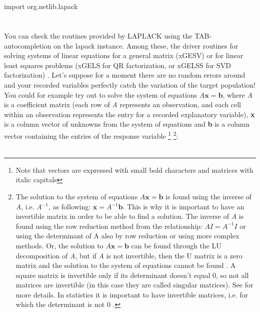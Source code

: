 \documentclass {article}
\begin{document}
\\
\\
import org.netlib.lapack\\
\\
\\
You can check the routines provided by LAPLACK using the TAB-autocompletion on the lapack instance. Among these, the driver routines for solving systems of linear equations for a general matrix (xGESV) or for linear least squares problems (xGELS for QR factorization, or xGELSS for SVD factorization) \cite{anderson_lapack_1999}. 
Let's suppose for a moment there are no random errors around and your recorded variables perfectly catch the variation of the target population! You could for example try out to solve the system of equations $A\textbf{x}=\textbf{b}$, where \textit{A} is a coefficient matrix (each row of \textit{A} represents an observation, and each cell within an observation represents the entry for a recorded explanatory variable), \textbf{x} is a column vector of unknowns from the system of equations and \textbf{b} is a column vector containing the entries of the response variable \cite{golub_matrix_2013} \cite{nag_ltd._nag_nodate} \cite{seymour_using_2017} \cite{dawkins_pauls_2005} \cite{odersky_programming_2010} \cite{lewis_introduction_2017}
 \footnote{Note that vectors are expressed with small bold characters and matrices with italic capitals} 
\footnote{The solution to the system of equations $A\textbf{x}=\textbf{b}$ is found using the inverse of \textit{A}, i.e. \textit{A$^{-1}$}, as following: $\textbf{x}=\textit{A$^{-1}$}\textbf{b}$.
 This is why it is important to have an invertible matrix in order to be able to find a solution. The inverse of \textit{A} is found using the row reduction method from the relationship: $AI=A^{-1}I$ or using the determinant of A also by row reduction or using more complex methods.
 Or, the solution to $A\textbf{x}=\textbf{b}$ can be found through the LU decomposition of \textit{A}, but if \textit{A} is not invertible, then the U matrix is a zero matrix and the solution to the system of equations cannot be found \cite{icl_javadoc_2017} \cite{intel_mkl_2017}. A square matrix is invertible only if its determinant doesn't equal 0, so not all matrices are invertible (in this case they are called singular matrices). See \cite{dawkins_pauls_2005} for more details. In statistics it is important to have invertible matrices, i.e. for which the determinant is not 0 \cite{quinn_experimental_2002}.}:
\\
\\
\end{document}
